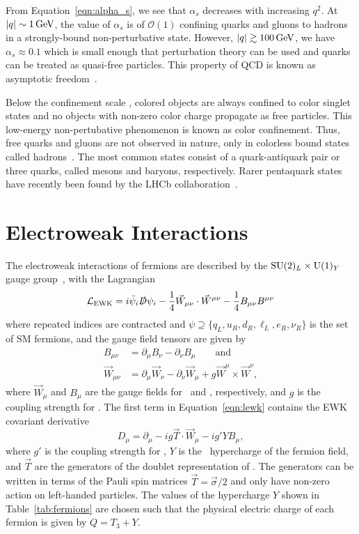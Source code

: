 From Equation~\ref{eqn:alpha_s}, we see that $\alpha_s$ decreases with increasing $q^2$.
At $\lvert q \rvert \sim 1\,\text{Ge\hspace{-.08em}V}$, the value of $\alpha_s$ is of $\mathcal{O}(1)$ confining quarks and gluons to hadrons in a strongly-bound non-perturbative state.
However, $\lvert q \rvert \gtrsim 100\,\text{Ge\hspace{-.08em}V}$, we have $\alpha_s \approx 0.1$ which is small enough that perturbation theory can be used and quarks can be treated as quasi-free particles.
This property of QCD is known as asymptotic freedom~\cite{Wilczek1973}.

Below the confinement scale \lqcd, colored objects are always confined to color singlet states and no objects with non-zero color charge propagate as free particles.
This low-energy non-pertubative phenomenon is known as color confinement.
Thus, free quarks and gluons are not observed in nature, only in colorless bound states called hadrons~\cite{Gellmann1964}.
The most common states consist of a quark-antiquark pair or three quarks, called mesons and baryons, respectively.
Rarer pentaquark states have recently been found by the LHCb collaboration~\cite{LHCb2015}.

\section{Electroweak Interactions}
\label{sec:ewk}

The electroweak interactions of fermions are described by the $\text{SU}(2)_L \times \text{U}(1)_Y$ gauge group~\cite{Glashow1961, Weinberg1967, Salam1968}, with the Lagrangian
\begin{equation}
  \label{eqn:lewk}
  \mathcal{L}_{\text{EWK}} = i \bar \psi_i \slashed D \psi_i - \frac{1}{4} \vec W_{\mu\nu} \cdot \vec W^{\mu\nu} - \frac{1}{4} B_{\mu\nu} B^{\mu\nu}
\end{equation}
where repeated indices are contracted and $\psi \supseteq \{q_L, u_R, d_R, \ell_L, e_R, \nu_R\}$ is the set of SM fermions, and the gauge field tensors are given by
\begin{align}
  B_{\mu\nu} & = \partial_\mu B_\nu - \partial_\nu B_\mu \qquad \text{and} \nonumber \\
  \vec W_{\mu\nu} & = \partial_\mu \vec W_\nu - \partial_\nu \vec W_\mu + g \vec W^\mu \times \vec W^\nu ,
\end{align}
where $\vec W_\mu$ and $B_\mu$ are the gauge fields for \sutwo\ and \uone, respectively, and $g$ is the coupling strength for \sutwo.
The first term in Equation~\ref{eqn:lewk} contains the EWK covariant derivative
\begin{equation}
  D_{\mu} = \partial_\mu - i g \vec T \cdot \vec W_\mu - i g' Y B_\mu,
\end{equation}
where $g'$ is the coupling strength for \uone,
$Y$ is the \uone\ hypercharge of the fermion field,
and $\vec T$ are the generators of the doublet representation of \sutwo.
The generators can be written in terms of the Pauli spin matrices $\vec T = \vec \sigma / 2$ and only have non-zero action on left-handed particles. 
The values of the hypercharge $Y$ shown in Table~\ref{tab:fermions} are chosen such that the physical electric charge of each fermion is given by $Q =  T_3 + Y$.

